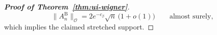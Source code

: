 \documentclass[11pt,a4paper]{article}
\newcommand{\be}{\begin{equation}}
\newcommand{\ee}{\end{equation}}
\newcommand{\op}{\mathcal{O}}
\begin{document}
\begin{proof}[\textbf{Proof of Theorem~\ref{thm:ui-wigner}}]
\be
\|A_n^{\mathrm B}\|_{\op}=2e^{-c_\beta}\sqrt n\,\big(1+o(1)\big)
\qquad\text{almost surely},
\ee
which implies the claimed stretched support.
\end{proof}
\newpage


\end{document}
